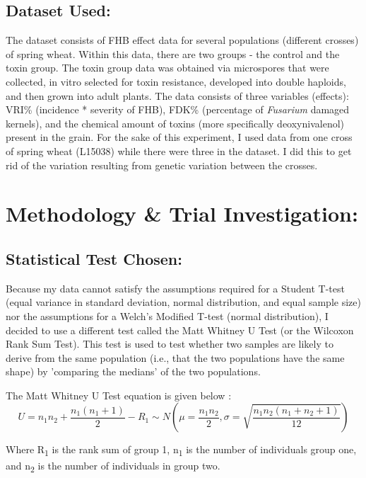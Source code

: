 \documentclass[11pt]{article}
\begin{document}
\subsection{Dataset Used:}
\label{sec:org856908f}
The dataset consists of FHB effect data for several populations (different crosses) of spring wheat. 
Within this data, there are two groups - the control and the toxin group. The toxin group data was obtained via microspores that were collected, in vitro selected
for toxin resistance, developed into double haploids, and then grown into adult plants. The data consists of three
variables (effects): VRI\% (incidence * severity of FHB), FDK\% (percentage of \emph{Fusarium} damaged kernels), and the chemical amount of toxins (more specifically deoxynivalenol) present in the grain. For the sake of this experiment, I used data from one cross of spring wheat (L15038) while there were three in the dataset.
I did this to get rid of the variation resulting from genetic variation between the crosses.    
\section{Methodology \& Trial Investigation:}
\label{sec:org3512a93}
\subsection{Statistical Test Chosen:}
\label{sec:orgb9f5588}
Because my data cannot satisfy the assumptions required for a Student T-test (equal variance in standard deviation, normal distribution, and equal sample size) nor
the assumptions for a Welch's Modified T-test (normal distribution), I decided to use a different
test called the Matt Whitney U Test (or the Wilcoxon Rank Sum Test). This test is 
used to test whether two samples are likely to derive from the same population \cite{manwhit} (i.e., that the two populations have the same shape) by 'comparing the medians' of the two populations.

The Matt Whitney U Test equation is given below \cite{bremer_doerge_2010}:
\begin{equation}
U = n_{1}n_{2} + \frac{n_{1}(n_{1}+1)}{2} - R_1 \sim N\left(\mu = \frac{n_{1}n_{2}}{2}, \sigma = \sqrt{\frac{n_{1}n_{2}(n_{1} + n_{2} + 1)}{12}}\right)
\end{equation}

Where R\textsubscript{1} is the rank sum of group 1, n\textsubscript{1} is the number of individuals group one, and n\textsubscript{2} is the number of individuals in group two.
\end{document}
